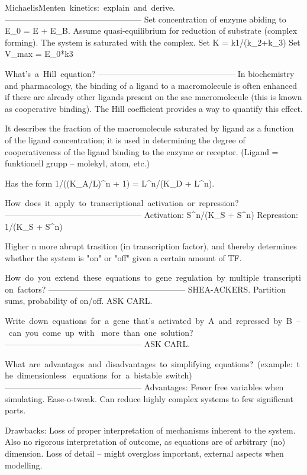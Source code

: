 Michaelis­Menten kinetics: explain and derive.
--------------------------------------------------
Set concentration of enzyme abiding to E_0 = E + E_B. 
Assume quasi-equilibrium for reduction of substrate (complex forming).
The system is saturated with the complex.
Set K = k1/(k_2+k_3)
Set V_{max} = E_0*k3

What’s a Hill equation?
--------------------------------------------------
In biochemistry and pharmacology, the binding of a ligand to a macromolecule is
often enhanced if there are already other ligands present on the sae
macromolecule (this is known as cooperative binding). The Hill coefficient
provides a way to quantify this effect.

It describes the fraction of the macromolecule saturated by ligand as a function
of the ligand concentration; it is used in determining the degree of
cooperativeness of the ligand binding to the enzyme or receptor.
(Ligand = funktionell grupp -- molekyl, atom, etc.) 

Has the form 1/((K_A/L)^n + 1) = L^n/(K_D + L^n).

How does it apply to transcriptional activation or repression?
--------------------------------------------------
Activation: S^n/(K_S + S^n)
Repression: 1/(K_S + S^n)

Higher n \rightarrow more abrupt trasition (in transcription factor), and
thereby determines whether the system is "on" or "off" given a certain amount of
TF.

How do you extend these equations to gene regulation by multiple transcription factors?
--------------------------------------------------
SHEA-ACKERS. Partition sums, probability of on/off. 
ASK CARL. 


Write down equations for a gene that's activated by A and repressed by B – can you come up with 
more than one solution?
--------------------------------------------------
ASK CARL.


What are advantages and disadvantages to simplifying equations? (example: the dimensionless 
equations for a bistable switch)
--------------------------------------------------
Advantages: Fewer free variables when simulating. Ease-o-tweak. 
Can reduce highly complex systems to few significant parts. 

Drawbacks: Loss of proper interpretation of mechanisms inherent to the system.
Also no rigorous interpretation of outcome, as equations are of arbitrary (no) dimension.
Loss of detail -- might overgloss important, external aspects when modelling.  

